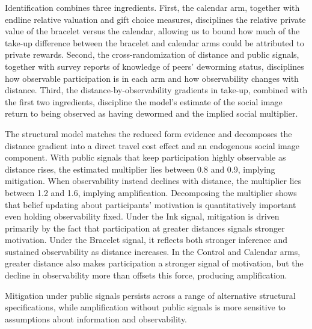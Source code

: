 \documentclass[12pt,a4paper]{article}
\begin{document}
Identification combines three ingredients. First, the calendar arm, together with endline relative valuation and gift choice measures, disciplines the relative private value of the bracelet versus the calendar, allowing us to bound how much of the take-up difference between the bracelet and calendar arms could be attributed to private rewards. Second, the cross-randomization of distance and public signals, together with survey reports of knowledge of peers' deworming status, disciplines how observable participation is in each arm and how observability changes with distance. Third, the distance-by-observability gradients in take-up, combined with the first two ingredients, discipline the model's estimate of the social image return to being observed as having dewormed and the implied social multiplier.

The structural model matches the reduced form evidence and decomposes the distance gradient into a direct travel cost effect and an endogenous social image component. With public signals that keep participation highly observable as distance rises, the estimated multiplier lies between 0.8 and 0.9, implying mitigation. When observability instead declines with distance, the multiplier lies between 1.2 and 1.6, implying amplification. Decomposing the multiplier shows that belief updating about participants' motivation is quantitatively important even holding observability fixed. Under the Ink signal, mitigation is driven primarily by the fact that participation at greater distances signals stronger motivation. Under the Bracelet signal, it reflects both stronger inference and sustained observability as distance increases. In the Control and Calendar arms, greater distance also makes participation a stronger signal of motivation, but the decline in observability more than offsets this force, producing amplification.

Mitigation under public signals persists across a range of alternative structural specifications, while amplification without public signals is more sensitive to assumptions about information and observability.
\end{document}
